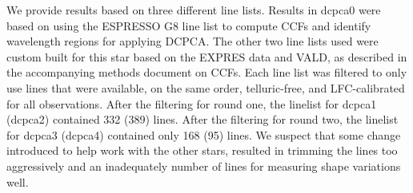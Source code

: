 \documentclass[12pt]{article}
\begin{document}
We provide results based on three different line lists.
Results in dcpca0 were based on using the ESPRESSO G8 line list to compute CCFs and identify wavelength regions for applying DCPCA.
The other two line lists used were custom built for this star based on the EXPRES data and VALD, as described in the accompanying methods document on CCFs.
Each line list was filtered to only use lines that were available, on the same order, telluric-free, and LFC-calibrated for all observations.
After the filtering for round one, the linelist for dcpca1 (dcpca2) contained 332 (389) lines.
After the filtering for round two, the linelist for dcpca3 (dcpca4) contained only 168 (95) lines.  We suspect that some change introduced to help work with the other stars, resulted in trimming the lines too aggressively and an inadequately number of lines for measuring shape variations well.  
\end{document}

